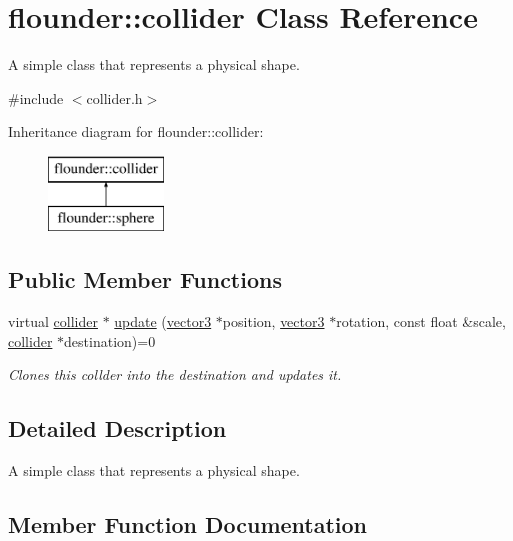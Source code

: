 \hypertarget{classflounder_1_1collider}{}\section{flounder\+:\+:collider Class Reference}
\label{classflounder_1_1collider}


A simple class that represents a physical shape.  




{\ttfamily \#include $<$collider.\+h$>$}

Inheritance diagram for flounder\+:\+:collider\+:\begin{figure}[H]
\begin{center}
\leavevmode
\includegraphics[height=2.000000cm]{classflounder_1_1collider}
\end{center}
\end{figure}
\subsection*{Public Member Functions}
\begin{DoxyCompactItemize}
\item 
virtual \hyperlink{classflounder_1_1collider}{collider} $\ast$ \hyperlink{classflounder_1_1collider_a87949f913283dcedab16b8bdfb73e8fa}{update} (\hyperlink{classflounder_1_1vector3}{vector3} $\ast$position, \hyperlink{classflounder_1_1vector3}{vector3} $\ast$rotation, const float \&scale, \hyperlink{classflounder_1_1collider}{collider} $\ast$destination)=0
\begin{DoxyCompactList}\small\item\em Clones this collder into the destination and updates it. \end{DoxyCompactList}\end{DoxyCompactItemize}


\subsection{Detailed Description}
A simple class that represents a physical shape. 



\subsection{Member Function Documentation}
\mbox{\label{classflounder_1_1collider_a87949f913283dcedab16b8bdfb73e8fa}} 

